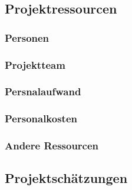 \subsection{ Projektressourcen }
\subsubsection{ Personen }
\subsubsection{ Projektteam }
\subsubsection{ Persnalaufwand }
\subsubsection{ Personalkosten }
\subsubsection{ Andere Ressourcen }
\subsection{ Projektschätzungen }
